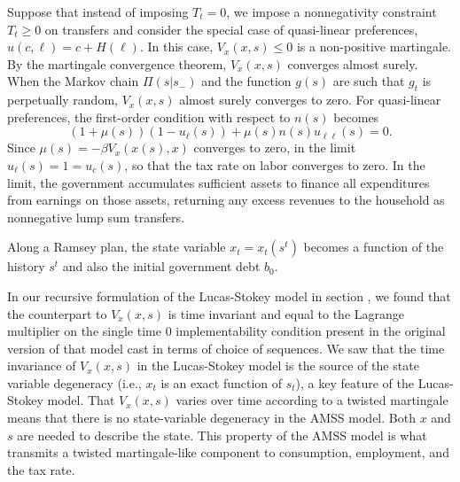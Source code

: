 \medskip

  Suppose that instead of imposing $T_t = 0$, we impose
a nonnegativity constraint $T_t\geq 0$ on  transfers and consider the special case of quasi-linear preferences,
$u(c,\ell)= c + H(\ell)$.   In this case,  $V_x(x,s)\leq 0$  is a non-positive martingale.  By the martingale convergence
 theorem, $V_x(x,s)$ converges almost surely.
%
When  the Markov chain $\Pi(s| s_-)$ and the function $g(s)$ are such that $g_t$ is perpetually random,
$V_x(x, s)$ almost surely converges to zero.  %
For  quasi-linear preferences, the first-order condition with respect to $n(s)$ becomes
$$ (1+\mu(s) ) (1 - u_\ell(s)) + \mu(s) n(s) u_{\ell \ell}(s) =0  .$$
Since $\mu(s) = - \beta V_x(x(s),x) $ converges to zero, in the limit $u_\ell(s)= 1 =u_c(s)$, so that
the tax rate on labor converges to zero. In the limit, the government
accumulates sufficient assets
to finance all expenditures from earnings on those assets, returning any excess revenues to the household as nonnegative lump sum transfers.

\medskip


 Along a Ramsey plan, the state variable $x_t = x_t(s^t)$  becomes a function of the history $s^t$ and also
the initial government debt $b_0$.


\medskip

 In our recursive formulation of the  Lucas-Stokey model in section , we found that the counterpart to $V_x(x,s)$ is time invariant
and equal to
the Lagrange multiplier on the single time $0$ implementability condition present in the original version of that model cast in terms of choice of sequences.
We saw that the time invariance of $V_x(x,s)$ in the Lucas-Stokey model is the source of the state variable degeneracy (i.e., $x_t$ is an exact function of
$s_t$), a key feature of the Lucas-Stokey model.
That $V_x(x,s)$ varies over time according to a twisted martingale means that there is no state-variable degeneracy in the AMSS model.
Both $x$ and $s$ are needed to describe the state.  This property of the
AMSS model is what transmits a twisted martingale-like component  to consumption, employment, and the tax rate.
\medskip

